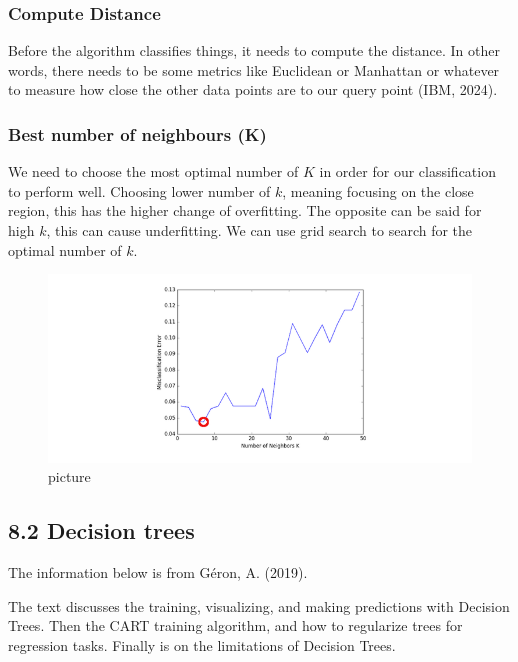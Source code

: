 \documentclass[
  letterpaper,
  DIV=11,
  numbers=noendperiod]{scrartcl}
\begin{document}
\subsubsection{Compute Distance}\label{compute-distance}

Before the algorithm classifies things, it needs to compute the
distance. In other words, there needs to be some metrics like Euclidean
or Manhattan or whatever to measure how close the other data points are
to our query point (IBM, 2024).

\subsubsection{Best number of neighbours
(K)}\label{best-number-of-neighbours-k}

We need to choose the most optimal number of \(K\) in order for our
classification to perform well. Choosing lower number of \(k\), meaning
focusing on the close region, this has the higher change of overfitting.
The opposite can be said for high \(k\), this can cause underfitting. We
can use grid search to search for the optimal number of \(k\).

\begin{figure}[H]

{\centering \includegraphics{12.png}

}

\caption{picture}

\end{figure}%

\subsection{8.2 Decision trees}\label{decision-trees}

The information below is from Géron, A. (2019).

The text discusses the training, visualizing, and making predictions
with Decision Trees. Then the CART training algorithm, and how to
regularize trees for regression tasks. Finally is on the limitations of
Decision Trees.
\end{document}
